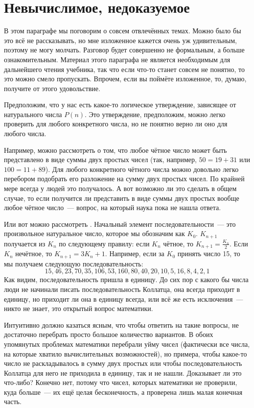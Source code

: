 \section{Невычислимое, недоказуемое}

В этом параграфе мы поговорим о совсем отвлечённых темах. Можно было бы это всё не рассказывать, но мне изложенное кажется очень уж удивительным, поэтому не могу молчать. Разговор будет совершенно не формальным, а больше ознакомительным. Материал этого параграфа не является необходимым для дальнейшего чтения учебника, так что если что-то станет совсем не понятно, то это можно смело пропускать. Впрочем, если вы поймёте изложенное, то, думаю, получите от этого удовольствие.

Предположим, что у нас есть какое-то логическое утверждение, зависящее от натурального числа $P(n)$. Это утверждение, предположим, можно легко проверить для любого конкретного числа, но не понятно верно ли оно для любого числа.

Например, можно рассмотреть  о том, что любое чётное число может быть представлено в виде суммы двух простых чисел (так, например, $50=19+31$ или $100=11+89$). Для любого конкретного чётного числа можно довольно легко перебором подобрать его разложение на сумму двух простых чисел. По крайней мере всегда у людей это получалось. А вот возможно ли это сделать в общем случае, то если получится ли представить в виде суммы двух простых вообще любое чётное число~--- вопрос, на который наука пока не нашла ответа.

Или вот можно рассмотреть . Начальный элемент последовательности~--- это произвольное натуральное число, которое мы обозначим как $K_0$. $K_{n+1}$ получается из $K_n$ по следующему правилу: если $K_n$ чётное, то $K_{n+1}=\frac{K_n}{2}$. Если $K_n$ нечётное, то $K_{n+1} = 3K_n  + 1$. Например, если за $K_0$ принять число 15, то мы получаем следующую последовательность:
$$15, 46, 23, 70, 35, 106, 53, 160, 80, 40, 20, 10, 5, 16, 8, 4, 2, 1$$
Как видим, последовательность пришла в единицу. До сих пор с какого бы числа люди не начинали писать последовательность Коллатца, она всегда приходит в единицу, но приходит ли она в единицу всегда, или всё же есть исключения~--- никто не знает, это открытый вопрос математики.

Интуитивно должно казаться ясным, что чтобы ответить на такие вопросы, не достаточно перебрать просто большое количество вариантов. В обоих упомянутых проблемах математики перебрали уйму чисел (фактически все числа, на которые хватило вычислительных возможностей), но примера, чтобы какое-то число не раскладывалось в сумму двух простых или чтобы последовательность Коллатца для него не приходила в единицу, так и не нашли. Доказывает ли это что-либо? Конечно нет, потому что чисел, которых математики не проверили, куда больше~--- их ещё целая бесконечность, а проверена лишь малая конечная часть.

